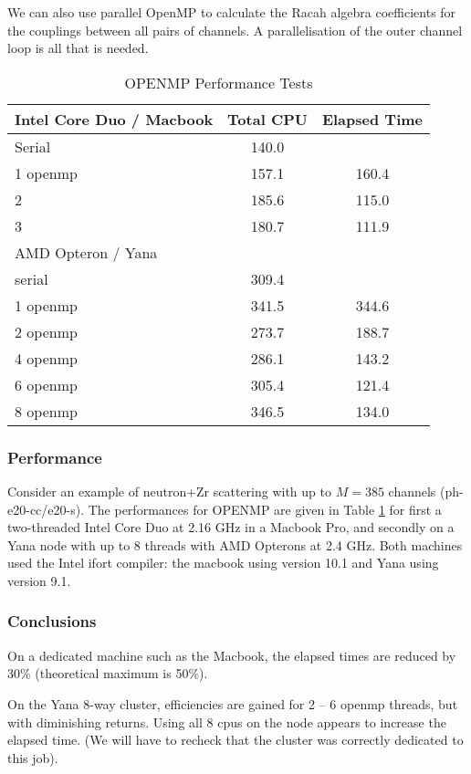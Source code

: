 \documentclass[11pt]{article}
\begin{document}
We can also use parallel OpenMP to calculate the Racah algebra coefficients for the couplings between all pairs of channels. A parallelisation of the outer channel loop is all that is needed.



\begin{table} 
\label{perf-openmp}
\begin{tabular}{lcc}
\hline \hline
Intel Core Duo / Macbook &    Total CPU    & Elapsed Time \\
\hline
Serial  & 140.0  &  \\
1 openmp & 157.1 & 160.4 \\
2              & 185.6 & 115.0 \\
3              & 180.7 & 111.9 \\
\hline \hline
AMD Opteron / Yana & & \\
\hline
serial &      309.4 & \\
1 openmp &      341.5 &     344.6  \\
2 openmp &      273.7 &     188.7  \\
4 openmp &      286.1 &     143.2  \\
6 openmp &      305.4 &     121.4 \\
8 openmp &      346.5 &     134.0 \\
\hline \hline
\end{tabular}
\caption{OPENMP Performance Tests} 
\end{table}

\subsubsection*{Performance}

Consider an example of neutron+Zr scattering with up to $M=385$ channels (ph-e20-cc/e20-s). 
The performances for OPENMP are given in Table \ref{perf-openmp} for first a two-threaded Intel Core Duo at 2.16 GHz in a Macbook Pro, and secondly on a Yana node with up to 8 threads with AMD Opterons at 2.4 GHz. Both machines used the Intel ifort compiler: the macbook using version 10.1 and Yana using version 9.1. 

\subsubsection*{Conclusions}

On a  dedicated machine such as the Macbook, the elapsed times are reduced by 30\% (theoretical maximum is 50\%).

On the Yana 8-way cluster, efficiencies are gained for 2 -- 6 openmp threads, but with diminishing returns. Using all 8 cpus on 
the node appears to increase the elapsed time. (We will have to recheck that the cluster was correctly dedicated to this job).
\end{document}
